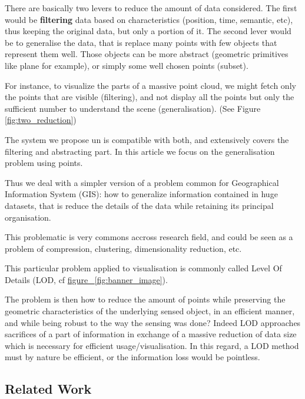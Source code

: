 		There are basically two levers to reduce the amount of data considered. The first would be \textbf{filtering} data based on characteristics (position, time, semantic, etc), thus keeping the original data, but only a portion of it.
		The second lever would be to generalise the data, that is replace many points with few objects that represent them well. Those objects can be more abstract (geometric primitives like plane for example), or simply some well chosen points (subset).
		
		For instance, to visualize the parts of a massive point cloud, we might fetch only the points that are visible (filtering),
		and not display all the points but only the sufficient number to understand the scene (generalisation).
		(See Figure \ref{fig:two_reduction})
		
		The system we propose un \cite{cura2015} is compatible with both, and extensively covers the filtering and abstracting part. In this article we focus on the generalisation problem using points.
		
		Thus we deal with a simpler version of a problem common for Geographical Information System (GIS): how to generalize information contained in huge datasets, that is reduce the details of the data while retaining its principal organisation.
		 
		This problematic is very commons accross research field, and could be seen as a problem of compression, clustering, dimensionality reduction, etc.
	  
		This particular problem applied to visualisation is commonly called Level Of Details (LOD, cf \href{banner_image}{figure ~\ref{fig:banner_image}}).
		
		The problem is then how to reduce the amount of points while preserving the geometric characteristics of the underlying sensed object, in an efficient manner, and while being robust to the way the sensing was done?
		Indeed LOD approaches sacrifices of a part of information in exchange of a massive reduction of data size which is necessary for efficient usage/visualisation. In this regard, a LOD method must by nature be efficient, or the information loss would be pointless.
		
		

	\subsection{Related Work} 
		
